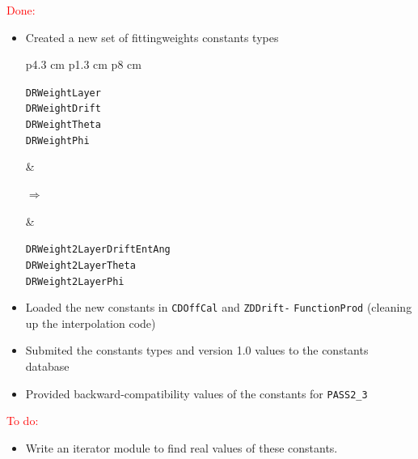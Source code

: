 \documentclass{article}
\begin{document}
\huge

\hspace{-2 cm}\textcolor{red}{\Huge \sc Done:}

\begin{itemize}

  \item Created a new set of fittingweights constants types

\begin{center}
  \begin{tabular}{p{4.3 cm} p{1.3 cm} p{8 cm}}
    \begin{minipage}{\linewidth}
      \LARGE \tt DRWeightLayer \\
      DRWeightDrift \\
      DRWeightTheta \\
      DRWeightPhi
    \end{minipage} &
    \begin{minipage}{\linewidth}
      \begin{center}
	\Huge $\Longrightarrow$
      \end{center}
    \end{minipage} &
    \begin{minipage}{\linewidth}
      \LARGE \tt DRWeight2LayerDriftEntAng \\
      DRWeight2LayerTheta \\
      DRWeight2LayerPhi
    \end{minipage}
  \end{tabular}
\end{center}

  \item Loaded the new constants in {\tt CDOffCal} and
  {\tt ZDDrift-} {\tt FunctionProd} (cleaning up the interpolation code)

  \item Submited the constants types and version 1.0 values to the
  constants database

  \item Provided backward-compatibility values of the constants for
  {\tt PASS2\_3}

\end{itemize}

\hspace{-2 cm}\textcolor{red}{\Huge \sc To do:}

\begin{itemize}

  \item Write an iterator module to find real values of these
  constants.

\end{itemize}
\end{document}
